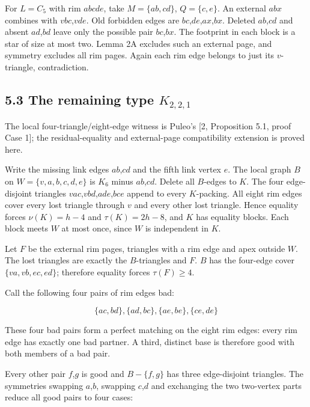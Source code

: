 \documentclass[11pt]{article}
\begin{document}
For \(L=C_5\) with rim \(abcde\), take \(M=\{ab,cd\}\), \(Q=\{c,e\}\).
An external \(abx\) combines with \(vbc\),\(vde\). Old forbidden edges
are \(bc\),\(de\),\(ax\),\(bx\). Deleted \(ab\),\(cd\) and absent
\(ad\),\(bd\) leave only the possible pair \(bc\),\(bx\). The footprint
in each block is a star of size at most two. Lemma 2A excludes such an
external page, and symmetry excludes all rim pages. Again each rim edge
belongs to just its \(v\)-triangle, contradiction.

\subsection{\texorpdfstring{5.3 The remaining type
\(K_{2,2,1}\)}{5.3 The remaining type K\_\{2,2,1\}}}\label{the-remaining-type-k_221}

The local four-triangle/eight-edge witness is Puleo's {[}2, Proposition
5.1, proof Case 1{]}; the residual-equality and external-page
compatibility extension is proved here.

Write the missing link edges \(ab\),\(cd\) and the fifth link vertex
\(e\). The local graph \(B\) on \(W=\{v,a,b,c,d,e\}\) is \(K_6\) minus
\(ab\),\(cd\). Delete all \(B\)-edges to \(K\). The four edge-disjoint
triangles \(vac\),\(vbd\),\(ade\),\(bce\) append to every \(K\)-packing.
All eight rim edges cover every lost triangle through \(v\) and every
other lost triangle. Hence equality forces \(\nu(K)=h-4\) and
\(\tau(K)=2h-8\), and \(K\) has equality blocks. Each block meets \(W\)
at most once, since \(W\) is independent in \(K\).

Let \(F\) be the external rim pages, triangles with a rim edge and apex
outside \(W\). The lost triangles are exactly the \(B\)-triangles and
\(F\). \(B\) has the four-edge cover \(\{va,vb,ec,ed\}\); therefore
equality forces \(\tau(F)\ge 4\).

Call the following four pairs of rim edges bad:

\[\{ac,bd\}, \{ad,bc\}, \{ae,be\}, \{ce,de\}\]

These four bad pairs form a perfect matching on the eight rim edges:
every rim edge has exactly one bad partner. A third, distinct base is
therefore good with both members of a bad pair.

Every other pair \(f\),\(g\) is good and \(B-\{f,g\}\) has three
edge-disjoint triangles. The symmetries swapping \(a\),\(b\), swapping
\(c\),\(d\) and exchanging the two two-vertex parts reduce all good
pairs to four cases:
\end{document}

